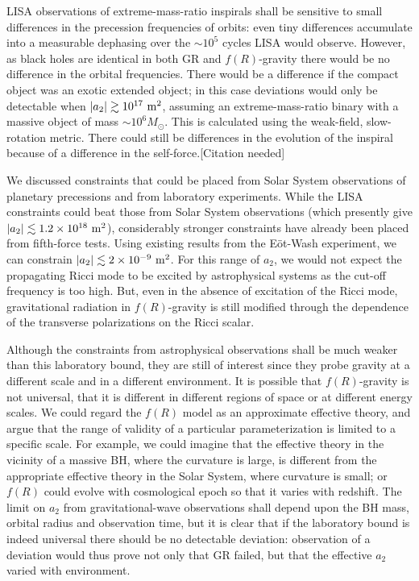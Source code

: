 LISA observations of extreme-mass-ratio inspirals shall be sensitive to small differences in the precession frequencies of orbits: even tiny differences accumulate into a measurable dephasing over the $\sim 10^5$ cycles LISA would observe. However, as black holes are identical in both GR and $f(R)$-gravity there would be no difference in the orbital frequencies. There would be a difference if the compact object was an exotic extended object; in this case deviations would only be detectable when $|a_2| \gtrsim 10^{17}~\mathrm{m^2}$, assuming an extreme-mass-ratio binary with a massive object of mass $\sim 10^6 M_\odot$. This is calculated using the weak-field, slow-rotation metric. There could still be differences in the evolution of the inspiral because of a difference in the self-force.[Citation needed]

We discussed constraints that could be placed from Solar System observations of planetary precessions and from laboratory experiments. While the LISA constraints could beat those from Solar System observations (which presently give $|a_2| \lesssim 1.2 \times 10^{18}~\mathrm{m^2}$), considerably stronger constraints have already been placed from fifth-force tests. Using existing results from the E\"ot-Wash experiment, we can constrain $|a_2| \lesssim 2 \times 10^{-9}~\mathrm{m^2}$. For this range of $a_2$, we would not expect the propagating Ricci mode to be excited by astrophysical systems as the cut-off frequency is too high. But, even in the absence of excitation of the Ricci mode, gravitational radiation in $f(R)$-gravity is still modified through the dependence of the transverse polarizations on the Ricci scalar. 

Although the constraints from astrophysical observations shall be much weaker than this laboratory bound, they are still of interest since they probe gravity at a different scale and in a different environment. It is possible that $f(R)$-gravity is not universal, that it is different in different regions of space or at different energy scales. We could regard the $f(R)$ model as an approximate effective theory, and argue that the range of validity of a particular parameterization is limited to a specific scale. For example, we could imagine that the effective theory in the vicinity of a massive BH, where the curvature is large, is different from the appropriate effective theory in the Solar System, where curvature is small; or $f(R)$ could evolve with cosmological epoch so that it varies with redshift. The limit on $a_2$ from gravitational-wave observations shall depend upon the BH mass, orbital radius and observation time, but it is clear that if the laboratory bound is indeed universal there should be no detectable deviation: observation of a deviation would thus prove not only that GR failed, but that the effective $a_2$ varied with environment.

